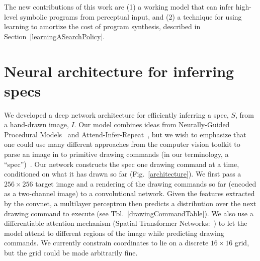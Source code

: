 \documentclass{article}
\theoremstyle{definition}
\begin{document}
 The new contributions of this work are (1) a working model that can infer high-level symbolic programs from perceptual input, and (2) a technique for using learning to amortize the cost of program synthesis, described in Section~\ref{learningASearchPolicy}.

\section{Neural architecture for inferring specs}\label{neuralNetworkSection}

We developed a deep network architecture for efficiently inferring a
spec, $S$, from a hand-drawn image, $I$.
Our model combines ideas from
Neurally-Guided Procedural Models~\citep{ritchie2016neurally}
and Attend-Infer-Repeat~\citep{eslami1603attend}, but
we wish to emphasize
that one could use
many different approaches from the computer vision toolkit to
parse an image in to primitive drawing commands  (in our terminology, a ``spec'')~\cite{nsd}.
Our network constructs the
spec one drawing command at a time, conditioned on what it has drawn so far (Fig.~\ref{architecture}).
We first
pass a $256\times 256$ target image and a rendering of the drawing commands so
far (encoded as a two-channel image) to a convolutional network. Given
the features extracted by the convnet, a multilayer perceptron then
predicts a distribution over the next drawing command to execute
(see Tbl.~\ref{drawingCommandTable}).
We also use a
differentiable attention mechanism (Spatial Transformer
Networks:~\cite{jaderberg2015spatial}) to let the model attend to
different regions of the image while predicting drawing commands.
We currently constrain
coordinates to lie on a discrete $16\times 16$ grid,
but the grid could be made arbitrarily fine.
\end{document}
